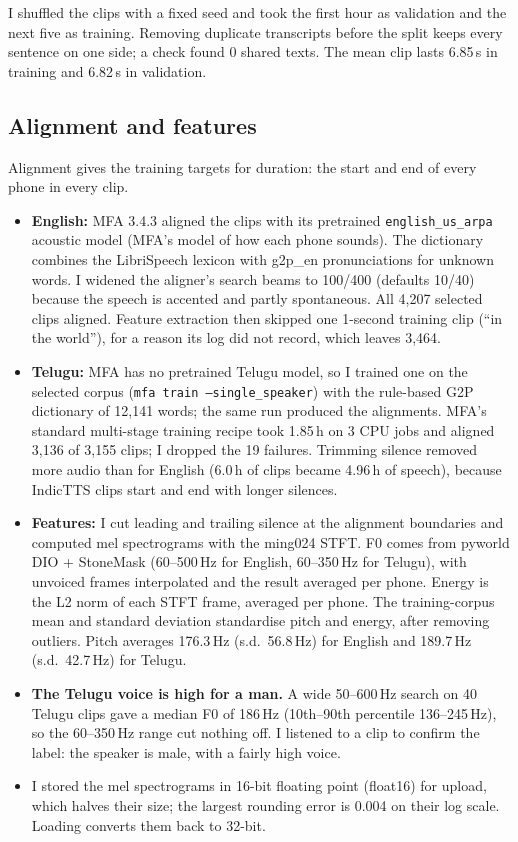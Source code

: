 \documentclass[11pt,a4paper]{article}
\newcommand{\code}[1]{\texttt{#1}}
\begin{document}
I shuffled the clips with a fixed seed and took the first hour as validation and the next five as training.
Removing duplicate transcripts before the split keeps every sentence on one side; a check found 0 shared texts.
The mean clip lasts 6.85\,s in training and 6.82\,s in validation.

\subsection{Alignment and features}
Alignment gives the training targets for duration: the start and end of every phone in every clip.
\begin{itemize}
\item \textbf{English:} MFA 3.4.3 aligned the clips with its pretrained \code{english\_us\_arpa} acoustic model (MFA's model of how
each phone sounds).
The dictionary combines the LibriSpeech lexicon with g2p\_en pronunciations for unknown words. I widened the aligner's
search beams to 100/400 (defaults 10/40) because the speech is accented and partly spontaneous. All 4,207 selected
clips aligned. Feature extraction then skipped one 1-second training clip (``in the world''), for a reason its log
did not record, which leaves 3,464.
\item \textbf{Telugu:} MFA has no pretrained Telugu model, so I trained one on the selected corpus
(\code{mfa train --single\_speaker}) with the rule-based G2P dictionary of 12,141 words; the same run produced the
alignments. MFA's standard multi-stage training recipe took 1.85\,h on 3 CPU jobs and aligned 3,136 of 3,155 clips; I dropped the 19 failures. Trimming silence removed
more audio than for English (6.0\,h of clips became 4.96\,h of speech), because IndicTTS clips start and end with
longer silences.
\item \textbf{Features:} I cut leading and trailing silence at the alignment boundaries and computed mel
spectrograms with the ming024 STFT. F0 comes from pyworld DIO + StoneMask (60--500\,Hz for English, 60--350\,Hz for
Telugu), with unvoiced frames interpolated and the result averaged per phone. Energy is the L2 norm of each STFT
frame, averaged per phone. The training-corpus mean and standard deviation standardise pitch and energy, after
removing outliers. Pitch averages 176.3\,Hz (s.d.\ 56.8\,Hz) for English and 189.7\,Hz (s.d.\ 42.7\,Hz) for Telugu.
\item \textbf{The Telugu voice is high for a man.} A wide 50--600\,Hz search on 40 Telugu clips gave a median F0
of 186\,Hz (10th--90th percentile 136--245\,Hz), so the 60--350\,Hz range cut nothing off. I listened to a clip
to confirm the label: the speaker is male, with a fairly high voice.
\item I stored the mel spectrograms in 16-bit floating point (float16) for upload, which halves their size; the
largest rounding error is 0.004 on their log scale. Loading converts them back to 32-bit.
\end{itemize}
\end{document}
